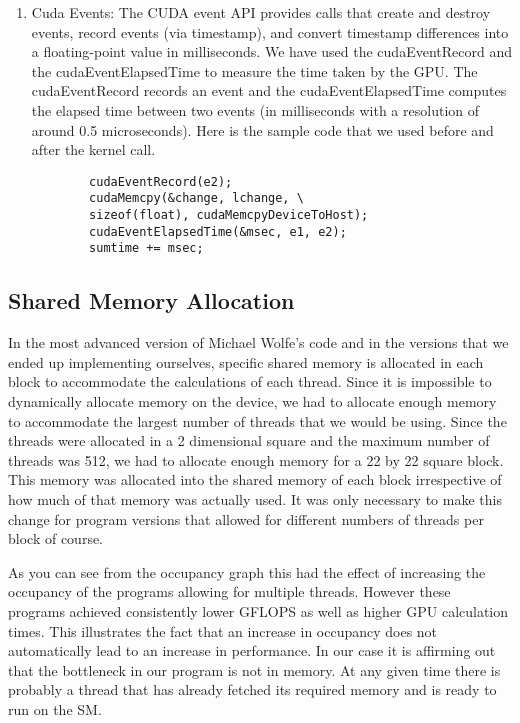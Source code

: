 \documentclass[10pt]{article}
\begin{document}
\begin{multicols}{2}
\begin{enumerate}
    \item Cuda Events: The CUDA event API provides calls that create and destroy events, record events (via timestamp), and convert timestamp differences into a floating-point value in milliseconds.
      We have used the cudaEventRecord and the cudaEventElapsedTime to  measure the time taken by the GPU.
      The cudaEventRecord records an event and the cudaEventElapsedTime  computes the elapsed time between two events (in milliseconds with a resolution of around 0.5 microseconds).
      Here is the sample code that we used before and after the kernel call. 

      \begin{verbatim}
        cudaEventRecord(e2);
        cudaMemcpy(&change, lchange, \
        sizeof(float), cudaMemcpyDeviceToHost);
        cudaEventElapsedTime(&msec, e1, e2);
        sumtime += msec;
      \end{verbatim}

  \end{enumerate}

  \subsection{Shared Memory Allocation}%
  In the most advanced version of Michael Wolfe's code and in the versions that we ended up implementing ourselves, specific shared memory is allocated in each block to accommodate the calculations of each thread.
  Since it is impossible to dynamically allocate memory on the device, we had to allocate enough memory to accommodate the largest number of threads that we would be using.
  Since the threads were allocated in a 2 dimensional square and the maximum number of threads was 512, we had to allocate enough memory for a 22 by 22 square block.
  This memory was allocated into the shared memory of each block irrespective of how much of that memory was actually used.
  It was only necessary to make this change for program versions that allowed for different numbers of threads per block of course.

  As you can see from the occupancy graph this had the effect of increasing the occupancy of the programs allowing for multiple threads.
  However these programs achieved consistently lower GFLOPS as well as higher GPU calculation times.
  This illustrates the fact that an increase in occupancy does not automatically lead to an increase in performance.
  In our case it is affirming out that the bottleneck in our program is not in memory.
  At any given time there is probably a thread that has already fetched its required memory and is ready to run on the SM.


\end{multicols}
\end{document}
